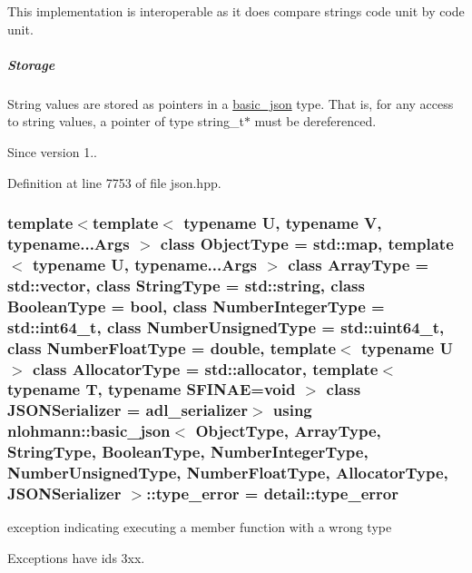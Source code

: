 This implementation is interoperable as it does compare strings code unit by code unit.

\subparagraph*{Storage}

String values are stored as pointers in a \hyperlink{classnlohmann_1_1basic__json}{basic\+\_\+json} type. That is, for any access to string values, a pointer of type {\ttfamily string\+\_\+t$\ast$} must be dereferenced.

\begin{DoxySince}{Since}
version 1.. 
\end{DoxySince}


Definition at line 7753 of file json.\+hpp.

\subsubsection[{\texorpdfstring{type\+\_\+error}{type_error}}]{\setlength{\rightskip}{0pt plus 5cm}template$<$template$<$ typename U, typename V, typename...\+Args $>$ class Object\+Type = std\+::map, template$<$ typename U, typename...\+Args $>$ class Array\+Type = std\+::vector, class String\+Type  = std\+::string, class Boolean\+Type  = bool, class Number\+Integer\+Type  = std\+::int64\+\_\+t, class Number\+Unsigned\+Type  = std\+::uint64\+\_\+t, class Number\+Float\+Type  = double, template$<$ typename U $>$ class Allocator\+Type = std\+::allocator, template$<$ typename T, typename S\+F\+I\+N\+A\+E=void $>$ class J\+S\+O\+N\+Serializer = adl\+\_\+serializer$>$ using {\bf nlohmann\+::basic\+\_\+json}$<$ Object\+Type, Array\+Type, String\+Type, Boolean\+Type, Number\+Integer\+Type, Number\+Unsigned\+Type, Number\+Float\+Type, Allocator\+Type, J\+S\+O\+N\+Serializer $>$\+::{\bf type\+\_\+error} =  {\bf detail\+::type\+\_\+error}}\hypertarget{classnlohmann_1_1basic__json_a4010e8e268fefd86da773c10318f2902}{}\label{classnlohmann_1_1basic__json_a4010e8e268fefd86da773c10318f2902}


exception indicating executing a member function with a wrong type 

Exceptions have ids 3xx.

